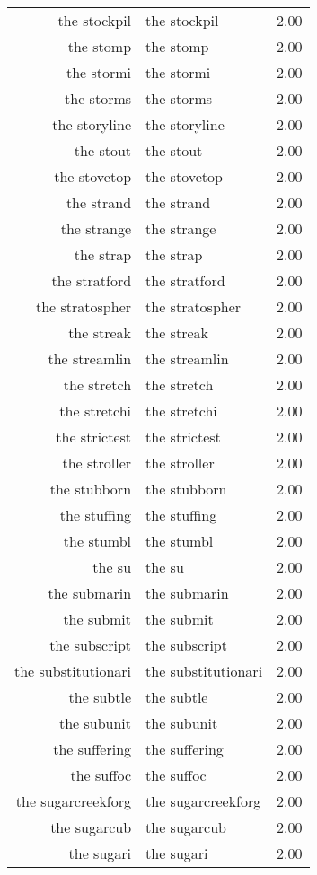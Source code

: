 \begin{table}[ht]
\begin{tabular}{rlr}
  the stockpil & the stockpil & 2.00 \\ 
  the stomp & the stomp & 2.00 \\ 
  the stormi & the stormi & 2.00 \\ 
  the storms & the storms & 2.00 \\ 
  the storyline & the storyline & 2.00 \\ 
  the stout & the stout & 2.00 \\ 
  the stovetop & the stovetop & 2.00 \\ 
  the strand & the strand & 2.00 \\ 
  the strange & the strange & 2.00 \\ 
  the strap & the strap & 2.00 \\ 
  the stratford & the stratford & 2.00 \\ 
  the stratospher & the stratospher & 2.00 \\ 
  the streak & the streak & 2.00 \\ 
  the streamlin & the streamlin & 2.00 \\ 
  the stretch & the stretch & 2.00 \\ 
  the stretchi & the stretchi & 2.00 \\ 
  the strictest & the strictest & 2.00 \\ 
  the stroller & the stroller & 2.00 \\ 
  the stubborn & the stubborn & 2.00 \\ 
  the stuffing & the stuffing & 2.00 \\ 
  the stumbl & the stumbl & 2.00 \\ 
  the su & the su & 2.00 \\ 
  the submarin & the submarin & 2.00 \\ 
  the submit & the submit & 2.00 \\ 
  the subscript & the subscript & 2.00 \\ 
  the substitutionari & the substitutionari & 2.00 \\ 
  the subtle & the subtle & 2.00 \\ 
  the subunit & the subunit & 2.00 \\ 
  the suffering & the suffering & 2.00 \\ 
  the suffoc & the suffoc & 2.00 \\ 
  the sugarcreekforg & the sugarcreekforg & 2.00 \\ 
  the sugarcub & the sugarcub & 2.00 \\ 
  the sugari & the sugari & 2.00 \\ 

\end{tabular}
\end{table}
